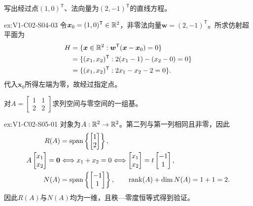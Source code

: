 \begin{SLChapterExercisePairSection}
\begin{exercise}[超平面]\label{ex:V1-C02-S04-03}
写出经过点$(1,0)^{\mathsf T}$、法向量为$(2,-1)^{\mathsf T}$的直线方程。
\end{exercise}
\label{sol:V1-C02-S04-03}
\begin{chapterexercisesolution}{ex:V1-C02-S04-03}
令$\boldsymbol{x}_0=(1,0)^{\mathsf T}\in\mathbb{R}^2$，非零法向量$\boldsymbol w=(2,-1)^{\mathsf T}$。所求仿射超平面为
\[
\begin{aligned}
H&=\{\boldsymbol{x}\in\mathbb{R}^2:
\boldsymbol w^{\mathsf T}(\boldsymbol{x}-\boldsymbol{x}_0)=0\}\\
&=\{(x_1,x_2)^{\mathsf T}:2(x_1-1)-(x_2-0)=0\}\\
&=\{(x_1,x_2)^{\mathsf T}:2x_1-x_2-2=0\}.
\end{aligned}
\]
代入$\boldsymbol{x}_0$所得左端为零，故经过指定点。
\end{chapterexercisesolution}

\begin{exercise}[基本子空间]\label{ex:V1-C02-S05-01}
对$A=\begin{bmatrix}1&1\\2&2\end{bmatrix}$求列空间与零空间的一组基。
\end{exercise}
\label{sol:V1-C02-S05-01}
\begin{chapterexercisesolution}{ex:V1-C02-S05-01}
对象为$A:\mathbb{R}^2\to\mathbb{R}^2$。第二列与第一列相同且非零，因此
\[
\begin{aligned}
R(A)&=\operatorname{span}\left\{\begin{bmatrix}1\\2\end{bmatrix}\right\},\\
A\begin{bmatrix}x_1\\x_2\end{bmatrix}=\boldsymbol0
&\Longleftrightarrow x_1+x_2=0
\Longleftrightarrow
\begin{bmatrix}x_1\\x_2\end{bmatrix}
=t\begin{bmatrix}-1\\1\end{bmatrix},\\
N(A)&=\operatorname{span}\left\{\begin{bmatrix}-1\\1\end{bmatrix}\right\},
\qquad \operatorname{rank}(A)+\dim N(A)=1+1=2.
\end{aligned}
\]
因此$R(A)$与$N(A)$均为一维，且秩—零度恒等式得到验证。
\end{chapterexercisesolution}


\end{SLChapterExercisePairSection}
